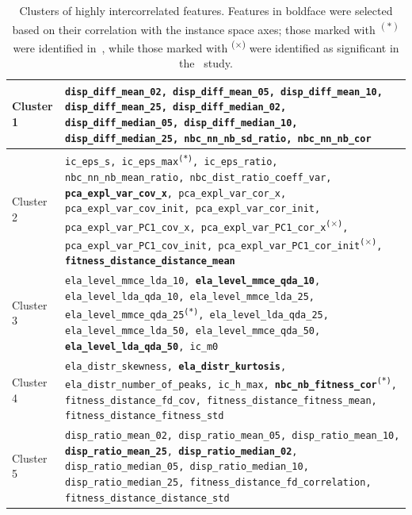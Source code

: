 \documentclass[acmsmall,screen,review,anonymous]{acmart}
\begin{document}
%
\begin{table}[!t]
    \caption{Clusters of highly intercorrelated features. Features in boldface were selected based on their correlation with the instance space axes; those marked with \textsuperscript{$\left(*\right)$} were identified in~\protect\cite{Malan2025}, while those marked with \textsuperscript{($\times$)} were identified as significant in the~\protect\citet{Long2022} study.}
    \label{tab:feature_clusters}
    \footnotesize
    \begin{tabular}{l>{\raggedright\arraybackslash}p{11.5cm}}
        \toprule
        Cluster 1 & {\tt disp\_diff\_mean\_02, disp\_diff\_mean\_05, disp\_diff\_mean\_10, \textbf{disp\_diff\_mean\_25}, disp\_diff\_median\_02, disp\_diff\_median\_05, disp\_diff\_median\_10, disp\_diff\_median\_25,  nbc\_nn\_nb\_sd\_ratio, \textbf{nbc\_nn\_nb\_cor} } \\
        \midrule
        
        Cluster 2 & {\tt ic\_eps\_s, {ic\_eps\_max}\textsuperscript{(*)}, ic\_eps\_ratio, nbc\_nn\_nb\_mean\_ratio, nbc\_dist\_ratio\_coeff\_var, \textbf{pca\_expl\_var\_cov\_x}, pca\_expl\_var\_cor\_x, pca\_expl\_var\_cov\_init, pca\_expl\_var\_cor\_init, pca\_expl\_var\_PC1\_cov\_x, {pca\_expl\_var\_PC1\_cor\_x}\textsuperscript{($\times$)}, pca\_expl\_var\_PC1\_cov\_init, {pca\_expl\_var\_PC1\_cor\_init}\textsuperscript{($\times$)}, \textbf{fitness\_distance\_distance\_mean}} \\
        \midrule
        
        Cluster 3 & {\tt ela\_level\_mmce\_lda\_10, \textbf{ela\_level\_mmce\_qda\_10}, ela\_level\_lda\_qda\_10, ela\_level\_mmce\_lda\_25, {ela\_level\_mmce\_qda\_25}\textsuperscript{(*)}, ela\_level\_lda\_qda\_25, {ela\_level\_mmce\_lda\_50}, ela\_level\_mmce\_qda\_50, \textbf{ela\_level\_lda\_qda\_50}, ic\_m0} \\
        \midrule
        
        Cluster 4 & {\tt ela\_distr\_skewness, \textbf{ela\_distr\_kurtosis}, ela\_distr\_number\_of\_peaks, ic\_h\_max, \textbf{nbc\_nb\_fitness\_cor}\textsuperscript{(*)}, fitness\_distance\_fd\_cov, fitness\_distance\_fitness\_mean, fitness\_distance\_fitness\_std} \\
        \midrule
        
        Cluster 5 & {\tt disp\_ratio\_mean\_02, disp\_ratio\_mean\_05, disp\_ratio\_mean\_10, \textbf{disp\_ratio\_mean\_25}, \textbf{disp\_ratio\_median\_02}, disp\_ratio\_median\_05, disp\_ratio\_median\_10, disp\_ratio\_median\_25, fitness\_distance\_fd\_correlation, fitness\_distance\_distance\_std} \\
        \bottomrule
    \end{tabular}
\end{table}
\end{document}
